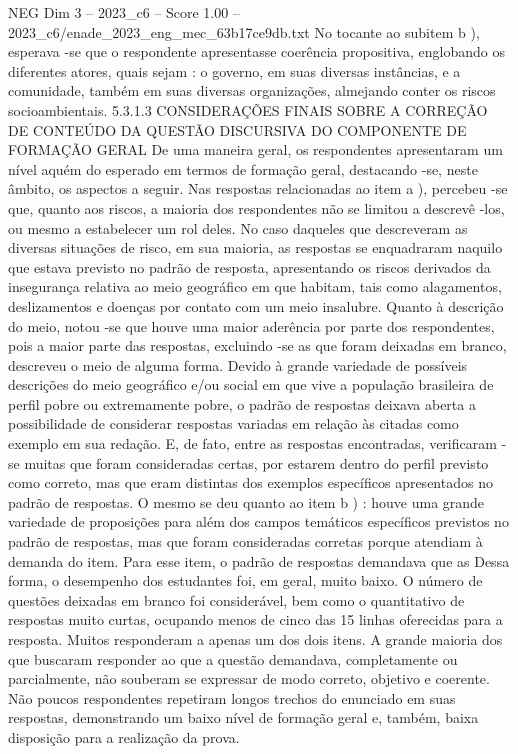 \begin{textsample}{NEG Dim 3 – 2023\_c6 – Score 1.00 – 2023\_c6/enade\_2023\_eng\_mec\_63b17ce9db.txt}
No tocante ao subitem b ), esperava -se que o respondente apresentasse coerência propositiva, englobando os diferentes atores, quais sejam : o governo, em suas diversas instâncias, e a comunidade, também em suas diversas organizações, almejando conter os riscos socioambientais. 5.3.1.3 CONSIDERAÇÕES FINAIS SOBRE A CORREÇÃO DE CONTEÚDO DA QUESTÃO DISCURSIVA DO COMPONENTE DE FORMAÇÃO GERAL De uma maneira geral, os respondentes apresentaram um nível aquém do esperado em termos de formação geral, destacando -se, neste âmbito, os aspectos a seguir.
Nas respostas relacionadas ao item a ), percebeu -se que, quanto aos riscos, a maioria dos respondentes não se limitou a descrevê -los, ou mesmo a estabelecer um rol deles.
No caso daqueles que descreveram as diversas situações de risco, em sua maioria, as respostas se enquadraram naquilo que estava previsto no padrão de resposta, apresentando os riscos derivados da insegurança relativa ao meio geográfico em que habitam, tais como alagamentos, deslizamentos e doenças por contato com um meio insalubre.
Quanto à descrição do meio, notou -se que houve uma maior aderência por parte dos respondentes, pois a maior parte das respostas, excluindo -se as que foram deixadas em branco, descreveu o meio de alguma forma.
Devido à grande variedade de possíveis descrições do meio geográfico e/ou social em que vive a população brasileira de perfil pobre ou extremamente pobre, o padrão de respostas deixava aberta a possibilidade de considerar respostas variadas em relação às citadas como exemplo em sua redação.
E, de fato, entre as respostas encontradas, verificaram -se muitas que foram consideradas certas, por estarem dentro do perfil previsto como correto, mas que eram distintas dos exemplos específicos apresentados no padrão de respostas.
O mesmo se deu quanto ao item b ) : houve uma grande variedade de proposições para além dos campos temáticos específicos previstos no padrão de respostas, mas que foram consideradas corretas porque atendiam à demanda do item.
Para esse item, o padrão de respostas demandava que as Dessa forma, o desempenho dos estudantes foi, em geral, muito baixo.
O número de questões deixadas em branco foi considerável, bem como o quantitativo de respostas muito curtas, ocupando menos de cinco das 15 linhas oferecidas para a resposta.
Muitos responderam a apenas um dos dois itens.
A grande maioria dos que buscaram responder ao que a questão demandava, completamente ou parcialmente, não souberam se expressar de modo correto, objetivo e coerente.
Não poucos respondentes repetiram longos trechos do enunciado em suas respostas, demonstrando um baixo nível de formação geral e, também, baixa disposição para a realização da prova.

\end{textsample}
